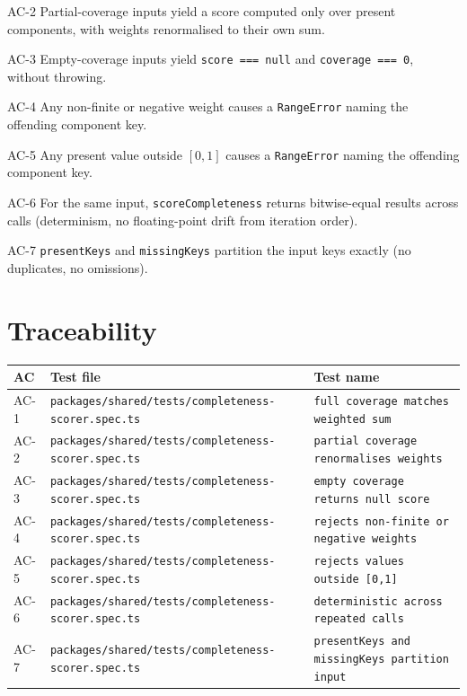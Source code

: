 \begin{ac}{AC-2}
Partial-coverage inputs yield a score computed only over present components, with weights renormalised to their own sum.
\end{ac}

\begin{ac}{AC-3}
Empty-coverage inputs yield \texttt{score === null} and \texttt{coverage === 0}, without throwing.
\end{ac}

\begin{ac}{AC-4}
Any non-finite or negative weight causes a \texttt{RangeError} naming the offending component key.
\end{ac}

\begin{ac}{AC-5}
Any present value outside \([0, 1]\) causes a \texttt{RangeError} naming the offending component key.
\end{ac}

\begin{ac}{AC-6}
For the same input, \texttt{scoreCompleteness} returns bitwise-equal results across calls (determinism, no floating-point drift from iteration order).
\end{ac}

\begin{ac}{AC-7}
\texttt{presentKeys} and \texttt{missingKeys} partition the input keys exactly (no duplicates, no omissions).
\end{ac}

\section{Traceability}

\begin{center}
\begin{tabular}{@{}lll@{}}
\toprule
AC & Test file & Test name \\
\midrule
AC-1 & \texttt{packages/shared/tests/completeness-scorer.spec.ts} & \texttt{full coverage matches weighted sum} \\
AC-2 & \texttt{packages/shared/tests/completeness-scorer.spec.ts} & \texttt{partial coverage renormalises weights} \\
AC-3 & \texttt{packages/shared/tests/completeness-scorer.spec.ts} & \texttt{empty coverage returns null score} \\
AC-4 & \texttt{packages/shared/tests/completeness-scorer.spec.ts} & \texttt{rejects non-finite or negative weights} \\
AC-5 & \texttt{packages/shared/tests/completeness-scorer.spec.ts} & \texttt{rejects values outside [0,1]} \\
AC-6 & \texttt{packages/shared/tests/completeness-scorer.spec.ts} & \texttt{deterministic across repeated calls} \\
AC-7 & \texttt{packages/shared/tests/completeness-scorer.spec.ts} & \texttt{presentKeys and missingKeys partition input} \\
\bottomrule
\end{tabular}
\end{center}

